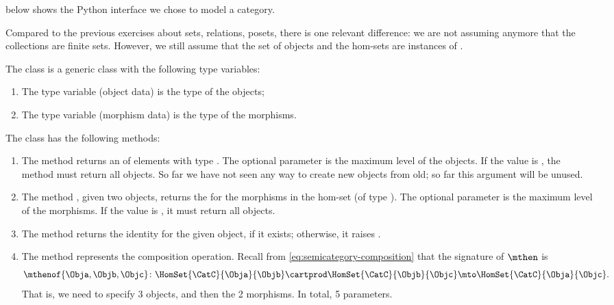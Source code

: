  below shows the Python interface we chose to model a category.

Compared to the previous exercises about sets, relations, posets, there is one relevant difference:
we are not assuming anymore that the collections are finite sets.
However, we still assume that the set of objects and the hom-sets are instances of \EnumerableSet.

The class \SemiCategory is a generic class with the following type variables:
\begin{enumerate}
    \item The type variable  (object data) is the type of the objects;
    \item The type variable  (morphism data) is the type of the morphisms.
\end{enumerate}

The class \SemiCategory has the following methods:
\begin{enumerate}
    \item The method  returns an \EnumerableSet of elements with type .
          The optional parameter is the maximum level of the objects.
          If the value is , the method must return all objects.
          So far we have not seen any way to create new objects from old; so far this argument will be unused.
    \item The method , given two objects, returns the \EnumerableSet for the morphisms in the hom-set (of type ).
          The optional parameter is the maximum level of the morphisms.
          If the value is ,  it must return all objects.
    \item The method  returns the identity for the given object, if it exists; otherwise, it raises .
    \item The method  represents the composition operation.
          Recall from \cref{eq:semicategory-composition} that the signature of $\mthen$ is
          \begin{equation}
              \mthenof{\Obja,\Objb,\Objc}\colon \HomSet{\CatC}{\Obja}{\Objb} \cartprod \HomSet{\CatC}{\Objb}{\Objc}\mto \HomSet{\CatC}{\Obja}{\Objc}.
          \end{equation}
          That is, we need to specify 3 objects, and then the 2 morphisms.
          In total, 5 parameters.
\end{enumerate}


